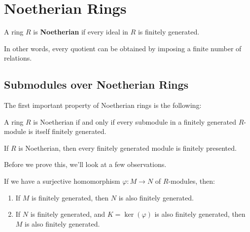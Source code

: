 

\section{Noetherian Rings}

\vspace{0.75em}

\begin{definition}
    A ring $R$ is \textbf{Noetherian} if every ideal in $R$ is finitely generated. 
\end{definition}

In other words, every quotient can be obtained by imposing a finite number of relations. 
\subsection{Submodules over Noetherian Rings}

The first important property of Noetherian rings is the following:

\begin{proposition}\label{noetheriansubmodules}
    A ring $R$ is Noetherian if and only if every submodule in a finitely generated $R$-module is itself finitely generated. 
\end{proposition}

\begin{corollary}\label{finpresented}
    If $R$ is Noetherian, then every finitely generated module is finitely presented. 
\end{corollary}

Before we prove this, we'll look at a few observations. 

\begin{lemma} \label{noetherianhomomorphisms}
    If we have a surjective homomorphism $\varphi : M \to N$ of $R$-modules, then:
    \begin{enumerate}
        \item If $M$ is finitely generated, then $N$ is also finitely generated. 
        \item If $N$ is finitely generated, and $K = \ker(\varphi)$ is also finitely generated, then $M$ is also finitely generated. 
    \end{enumerate}
\end{lemma}


